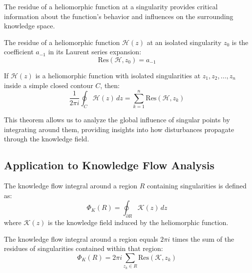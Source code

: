 The residue of a heliomorphic function at a singularity provides critical information about the function's behavior and influences on the surrounding knowledge space.

\begin{definition}[Residue]
The residue of a heliomorphic function $\mathcal{H}(z)$ at an isolated singularity $z_0$ is the coefficient $a_{-1}$ in its Laurent series expansion:
\begin{equation}
\text{Res}(\mathcal{H}, z_0) = a_{-1}
\end{equation}
\end{definition}

\begin{theorem}
If $\mathcal{H}(z)$ is a heliomorphic function with isolated singularities at $z_1, z_2, \ldots, z_n$ inside a simple closed contour $C$, then:
\begin{equation}
\frac{1}{2\pi i} \oint_C \mathcal{H}(z) \, dz = \sum_{k=1}^n \text{Res}(\mathcal{H}, z_k)
\end{equation}
\end{theorem}

This theorem allows us to analyze the global influence of singular points by integrating around them, providing insights into how disturbances propagate through the knowledge field.

\subsection{Application to Knowledge Flow Analysis}

\begin{definition}
The knowledge flow integral around a region $R$ containing singularities is defined as:
\begin{equation}
\Phi_K(R) = \oint_{\partial R} \mathcal{K}(z) \, dz
\end{equation}
where $\mathcal{K}(z)$ is the knowledge field induced by the heliomorphic function.
\end{definition}

\begin{theorem}
The knowledge flow integral around a region equals $2\pi i$ times the sum of the residues of singularities contained within that region:
\begin{equation}
\Phi_K(R) = 2\pi i \sum_{z_k \in R} \text{Res}(\mathcal{K}, z_k)
\end{equation}
\end{theorem}

